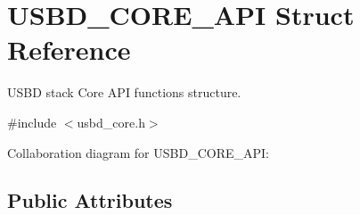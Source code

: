\hypertarget{structUSBD__CORE__API}{}\section{U\+S\+B\+D\+\_\+\+C\+O\+R\+E\+\_\+\+A\+PI Struct Reference}
\label{structUSBD__CORE__API}


U\+S\+BD stack Core A\+PI functions structure.  




{\ttfamily \#include $<$usbd\+\_\+core.\+h$>$}



Collaboration diagram for U\+S\+B\+D\+\_\+\+C\+O\+R\+E\+\_\+\+A\+PI\+:
\subsection*{Public Attributes}
